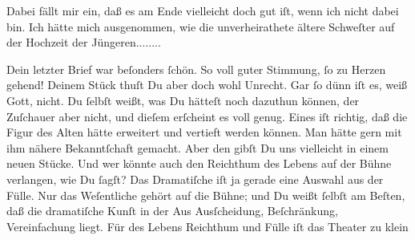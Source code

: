 \pstart
           Dabei fällt mir ein, daß es am Ende vielleicht doch gut iſt, wenn ich nicht dabei
               bin. Ich hätte mich ausgenommen, wie die unverheirathete ältere Schweſter auf der
               Hochzeit der Jüngeren........\pend
           
\pstart
           Dein letzter Brief war beſonders{ }ſchön. So voll guter Stimmung,{ }ſo zu Herzen gehend!
               Deinem Stück thuſt Du aber
               doch wohl Unrecht. Gar{ }ſo {\pb} dünn iſt es, weiß Gott, nicht. Du{ }ſelbſt weißt, was Du hätteſt  noch dazuthun können, der Zuſchauer aber nicht,
               und dieſem erſcheint es voll genug. Eines iſt  richtig, daß die Figur des Alten hätte erweitert und vertieft werden können. Man hätte gern mit ihm
               nähere Bekanntſchaft gemacht. Aber den gibſt Du uns vielleicht in einem neuen Stücke.
               Und wer könnte auch den Reichthum des Lebens auf der Bühne verlangen, wie Du{ }ſagſt?
                  \strikeout{\textcolor{gray}{×}} Das {\pb}Dramatiſche iſt ja gerade eine Auswahl
               aus der Fülle. Nur das Weſentliche gehört  auf die
               Bühne; und Du weißt{ }ſelbſt am Beſten, daß die dramatiſche Kunſt in der Aus\strikeout{\textcolor{gray}{×}} Ausſcheidung, Beſchränkung, Vereinfachung liegt. Für des Lebens Reichthum und
               Fülle  iſt das Theater zu klein{\dotssix}\pend
           
